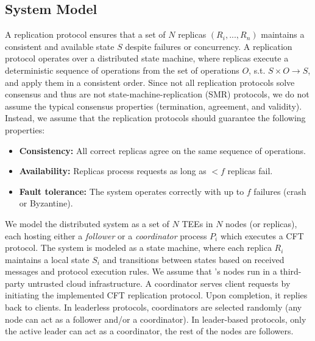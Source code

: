 

\subsection{System Model}
\label{sec:system_model}
A replication protocol ensures that a set of $N$  replicas $(R_i,...,R_n)$ maintains a consistent and available state $S$ despite failures or concurrency. A replication protocol operates over a distributed state machine, where replicas execute a deterministic sequence of operations from the set of operations $O$, s.t. $S \times O \rightarrow S$, and apply them in a consistent order.
Since not all replication protocols solve consensus and thus are not state-machine-replication (SMR) protocols, we do not assume the typical consensus properties (termination, agreement, and validity). Instead, we assume that the replication protocols should guarantee the following properties:

\begin{itemize}
    \item \textbf{Consistency:} All correct replicas agree on the same sequence of operations.
   \item \textbf{Availability:} Replicas process requests as long as $<f$ replicas fail.
    \item \textbf{Fault tolerance:} The system operates correctly with up to $f$ failures (crash or Byzantine).    
\end{itemize}



We model the distributed system as a set of $N$ TEEs in $N$ nodes (or replicas), each hosting either a \emph{follower} or a \textit{coordinator} process $P_i$ which executes a CFT protocol. The system is modeled as a state machine, where each replica $R_i$ maintains a local state $S_i$ and transitions between states based on received messages and protocol execution rules.
We assume that \projecttitle{}'s nodes run in a third-party untrusted cloud infrastructure. %
A coordinator serves client requests by initiating the implemented CFT replication protocol. Upon completion, it replies back to clients. In leaderless protocols, coordinators are selected randomly (any node can act as a follower and/or a coordinator). In leader-based protocols, only the active leader can act as a coordinator, the rest of the nodes are followers. %


